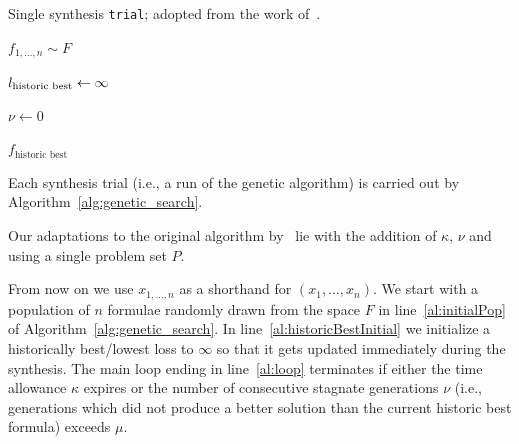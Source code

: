 \begin{algorithm}[t]
\DontPrintSemicolon
\caption{Single synthesis {\tt trial}; adopted from the work of~.}
\label{alg:genetic_search}
{\footnotesize
{}

$ f_{1,\dots,n} \sim F $ \; \label{al:initialPop}

$l_\text{\rm historic best} \gets \infty$ \; \label{al:historicBestInitial}

$ \nu \gets 0 $ \; \label{al:numStagInit}

  \label{al:loop}

\Return $ f_\text{historic best} $ \; \label{al:return_best}
}
\end{algorithm}

Each synthesis trial (i.e., a run of the genetic algorithm) is carried out by Algorithm~\ref{alg:genetic_search}.

Our adaptations to the original algorithm by~ lie with the addition of $ \kappa $, $ \nu $ and using a single problem set $ P $.

From now on we use $ x_{1, \dots, n} $ as a shorthand for $ (x_1, \dots, x_n) $. We start with a population of $ n $ formulae randomly drawn from the space $ F $ in line~\ref{al:initialPop} of Algorithm~\ref{alg:genetic_search}. In line~\ref{al:historicBestInitial} we initialize a historically best/lowest loss to $ \infty $ so that it gets updated immediately during the synthesis. The main loop ending in line~\ref{al:loop} terminates if either the time allowance $ \kappa $ expires or the number of consecutive stagnate generations $ \nu $ (i.e., generations which did not produce a better solution than the current historic best formula) exceeds $ \mu $.

